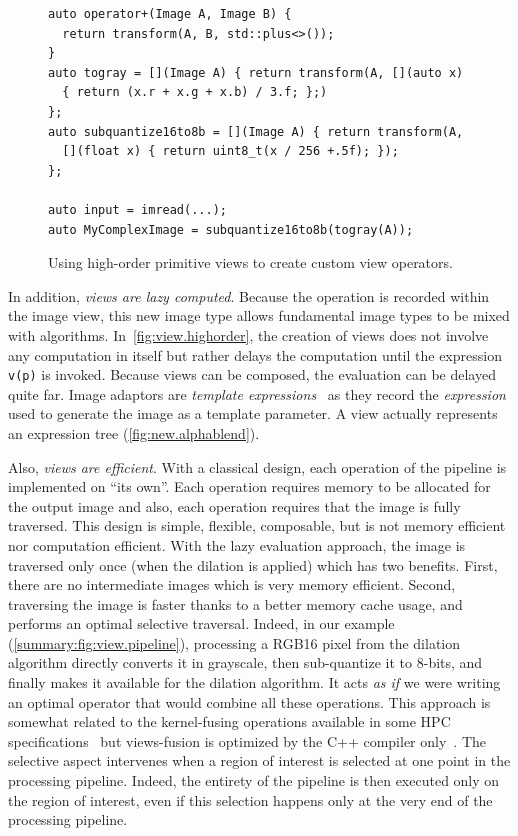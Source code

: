 \begin{figure}
  \begin{verbatim}
auto operator+(Image A, Image B) {
  return transform(A, B, std::plus<>());
}
auto togray = [](Image A) { return transform(A, [](auto x)
  { return (x.r + x.g + x.b) / 3.f; };)
};
auto subquantize16to8b = [](Image A) { return transform(A,
  [](float x) { return uint8_t(x / 256 +.5f); });
};

auto input = imread(...);
auto MyComplexImage = subquantize16to8b(togray(A));
  \end{verbatim}

  \caption[]{Using high-order primitive views to create custom view operators.}
  \label{summary:fig:view.highorder}
\end{figure}

In addition, \emph{views are lazy computed}. Because the operation is recorded within the image view, this new image
type allows fundamental image types to be mixed with algorithms. In~\cref{fig:view.highorder}, the creation of views
does not involve any computation in itself but rather delays the computation until the expression \texttt{v(p)} is
invoked. Because views can be composed, the evaluation can be delayed quite far. Image adaptors are \emph{template
  expressions}~\parencite{veldhuizen.1995.expression, veldhuizen.2000.blitz} as they record the \emph{expression} used to
generate the image as a template parameter. A view actually represents an expression tree (\cref{fig:new.alphablend}).

Also, \emph{views are efficient}. With a classical design, each operation of the pipeline is implemented on ``its own''.
Each operation requires memory to be allocated for the output image and also, each operation requires that the image is
fully traversed. This design is simple, flexible, composable, but is not memory efficient nor computation efficient.
With the lazy evaluation approach, the image is traversed only once (when the dilation is applied) which has two
benefits. First, there are no intermediate images which is very memory efficient. Second, traversing the image is faster
thanks to a better memory cache usage, and performs an optimal selective traversal. Indeed, in our example
(\cref{summary:fig:view.pipeline}), processing a RGB16 pixel from the dilation algorithm directly converts it in
grayscale, then sub-quantize it to 8-bits, and finally makes it available for the dilation algorithm. It acts \emph{as
  if} we were writing an optimal operator that would combine all these operations. This approach is somewhat related to
the kernel-fusing operations available in some HPC specifications~\parencite{openvx.2019} but views-fusion is optimized
by the C++ compiler only~\parencite{brown.2018.ranges}. The selective aspect intervenes when a region of interest is
selected at one point in the processing pipeline. Indeed, the entirety of the pipeline is then executed only on the
region of interest, even if this selection happens only at the very end of the processing pipeline.

